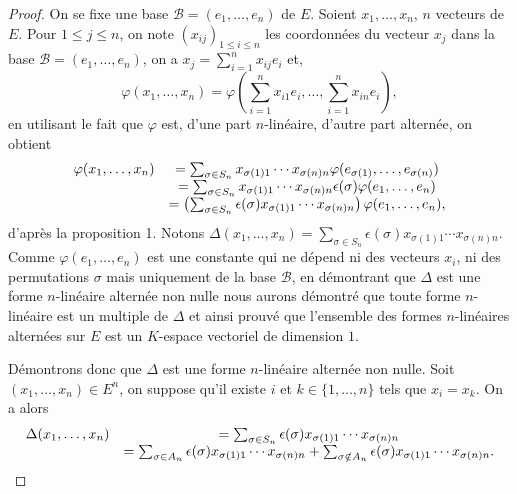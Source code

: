 \documentclass[class=report,crop=false]{standalone}
\begin{document}
\begin{proof}
On se fixe une base $\mathcal{B}=(e_1,\dots,e_n)$ de $E$.
Soient $x_1,\dots,x_n$, $n$ vecteurs de $E$. Pour $1\leq j\leq n$, on note $(x_{ij})_{1\leq i\leq n}$ les coordonnées du vecteur $x_j$ dans la base $\mathcal{B}=(e_1,\dots,e_n)$, on a $x_j=\sum_{i=1}^n x_{ij}e_i$ et,
$$\varphi(x_1,\dots,x_n)=\varphi\left(\sum_{i=1}^n x_{i1}e_i,\dots,\sum_{i=1}^n x_{in}e_i\right),$$
en utilisant le fait que $\varphi$ est, d'une part $n$-linéaire, d'autre part alternée, on obtient
$$\begin{array}{cc}\varphi(x_1,\dots,x_n)&=
\sum_{\sigma\in S_n}x_{\sigma(1)1}\cdots x_{\sigma(n)n}\varphi(e_{\sigma(1)},\dots,e_{\sigma(n)})\cr
&=\sum_{\sigma\in S_n}x_{\sigma(1)1}\cdots x_{\sigma(n)n}\epsilon(\sigma)\varphi(e_1,\dots, e_n)
\cr&=\left(\sum_{\sigma\in S_n}\epsilon(\sigma)x_{\sigma(1)1}\cdots x_{\sigma(n)n}\right)
\varphi(e_1,\dots, e_n),\end{array}$$ d'après la proposition 1. 
Notons $\Delta(x_1,\dots,x_n)=\sum_{\sigma\in S_n}\epsilon(\sigma)x_{\sigma(1)1}\cdots x_{\sigma(n)n}$. 
Comme $\varphi(e_1,\dots, e_n)$ est une constante qui ne dépend ni des vecteurs $x_i$, ni des permutations $\sigma$ mais uniquement de la base $\mathcal{B}$, en démontrant que $\Delta$ est une forme $n$-linéaire alternée non nulle nous aurons démontré que toute forme $n$-linéaire est un multiple de $\Delta$ et ainsi prouvé que l'ensemble des formes $n$-linéaires
alternées sur $E$ est un $K$-espace vectoriel de dimension $1$.

Démontrons donc que $\Delta$ est une forme $n$-linéaire alternée non nulle. Soit $(x_1,\dots,x_n)\in E^n$, on suppose qu'il existe $i$ et $k\in\{1,\dots,n\}$ tels que $x_i=x_k$. On a alors
$$\begin{array}{cc}\Delta(x_1,\dots,x_n)&=\sum_{\sigma\in S_n}\epsilon(\sigma) x_{\sigma(1)1}\cdots x_{\sigma(n)n}\cr
&=\sum_{\sigma\in A_n}\epsilon(\sigma) x_{\sigma(1)1}\cdots x_{\sigma(n)n}+\sum_{\sigma\notin A_n} \epsilon(\sigma)x_{\sigma(1)1}\cdots x_{\sigma(n)n}.\end{array}$$



\end{proof}
\end{document}
